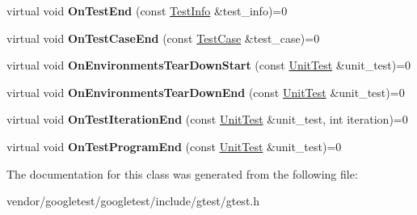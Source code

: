 \begin{DoxyCompactItemize}
\item 
\mbox{\label{classtesting_1_1_test_event_listener_abb1c44525ef038500608b5dc2f17099b}} 
virtual void {\bfseries On\+Test\+End} (const \hyperlink{classtesting_1_1_test_info}{Test\+Info} \&test\+\_\+info)=0
\item 
\mbox{\label{classtesting_1_1_test_event_listener_ae61985e2ef76ac78379b077be57a9c36}} 
virtual void {\bfseries On\+Test\+Case\+End} (const \hyperlink{classtesting_1_1_test_case}{Test\+Case} \&test\+\_\+case)=0
\item 
\mbox{\label{classtesting_1_1_test_event_listener_a468b5e6701bcb86cb2c956caadbba5e4}} 
virtual void {\bfseries On\+Environments\+Tear\+Down\+Start} (const \hyperlink{classtesting_1_1_unit_test}{Unit\+Test} \&unit\+\_\+test)=0
\item 
\mbox{\label{classtesting_1_1_test_event_listener_a9ea04fa7f447865ba76df35e12ba2092}} 
virtual void {\bfseries On\+Environments\+Tear\+Down\+End} (const \hyperlink{classtesting_1_1_unit_test}{Unit\+Test} \&unit\+\_\+test)=0
\item 
\mbox{\label{classtesting_1_1_test_event_listener_a550fdb3e55726e4cefa09f5697941425}} 
virtual void {\bfseries On\+Test\+Iteration\+End} (const \hyperlink{classtesting_1_1_unit_test}{Unit\+Test} \&unit\+\_\+test, int iteration)=0
\item 
\mbox{\label{classtesting_1_1_test_event_listener_ad15b6246d94c268e233487a86463ef3d}} 
virtual void {\bfseries On\+Test\+Program\+End} (const \hyperlink{classtesting_1_1_unit_test}{Unit\+Test} \&unit\+\_\+test)=0
\end{DoxyCompactItemize}


The documentation for this class was generated from the following file\+:\begin{DoxyCompactItemize}
\item 
vendor/googletest/googletest/include/gtest/gtest.\+h\end{DoxyCompactItemize}
